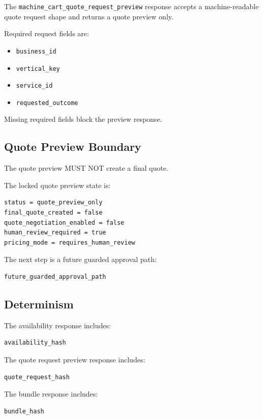 The \texttt{machine\_cart\_quote\_request\_preview} response accepts a machine-readable quote request shape and returns a quote preview only.

Required request fields are:

\begin{itemize}
  \item \texttt{business\_id}
  \item \texttt{vertical\_key}
  \item \texttt{service\_id}
  \item \texttt{requested\_outcome}
\end{itemize}

Missing required fields block the preview response.

\subsection{Quote Preview Boundary}

The quote preview MUST NOT create a final quote.

The locked quote preview state is:

\begin{verbatim}
status = quote_preview_only
final_quote_created = false
quote_negotiation_enabled = false
human_review_required = true
pricing_mode = requires_human_review
\end{verbatim}

The next step is a future guarded approval path:

\begin{verbatim}
future_guarded_approval_path
\end{verbatim}

\subsection{Determinism}

The availability response includes:

\begin{verbatim}
availability_hash
\end{verbatim}

The quote request preview response includes:

\begin{verbatim}
quote_request_hash
\end{verbatim}

The bundle response includes:

\begin{verbatim}
bundle_hash
\end{verbatim}

